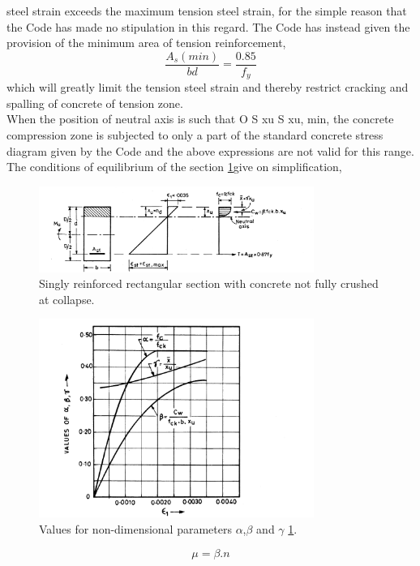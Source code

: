steel strain exceeds the maximum tension steel strain, for the simple reason that the Code
has made no stipulation in this regard. The Code has instead given the provision of the
minimum area of tension reinforcement,
$$\frac{A_s(min)}{bd} = \frac{0.85}{f_y}$$
which will greatly limit the tension steel strain and thereby restrict cracking and spalling of
concrete of tension zone.\\
When the position of neutral axis is such that O S xu S xu, min, the concrete compression
zone is subjected to only a part of the standard concrete stress diagram given by the Code and
the above expressions are not valid for this range. The conditions of equilibrium of the section
\fig \ref{Singly reinforced section}give on simpliﬁcation,
\begin{figure}
\centering
\includegraphics[width=0.8\textwidth]{images/ch2-2.png}
\caption{Singly reinforced rectangular section with concrete not fully crushed at collapse.}
\label{Singly reinforced section}
\end{figure}
\begin{figure}
\centering
\includegraphics[width=0.8\textwidth]{images/ch2-3.png}
\caption{Values for non-dimensional parameters ${\alpha}$,${\beta}$ and ${\gamma}$ \fig \ref{Singly reinforced section}.}
\label{Values for parameters}
\end{figure}
\newpage
\begin{equation}
\mu=\beta.n
\label{non-dimensional}
\end{equation}
